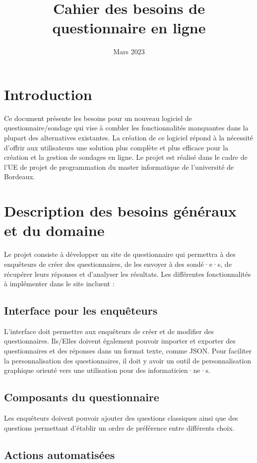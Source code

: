 \documentclass{article}
\title{Cahier des besoins de questionnaire en ligne}
\author{}
\date{Mars 2023}
\begin{document}
\maketitle

\section{Introduction}
Ce document présente les besoins pour un nouveau logiciel de questionnaire/sondage qui vise à combler les fonctionnalités manquantes dans la plupart des alternatives existantes. La création de ce logiciel répond à la nécessité d'offrir aux utilisateurs une solution plus complète et plus efficace pour la création et la gestion de sondages en ligne. Le projet est réalisé dans le cadre de l’UE de projet de programmation du master informatique de l’université de Bordeaux.

\section{Description des besoins généraux et du domaine}

Le projet consiste à développer un site de questionnaire qui permettra à des enquêteurs de créer des questionnaires, de les envoyer à des sondé·e·s, de récupérer leurs réponses et d'analyser les résultats. Les différentes fonctionnalités à implémenter dans le site incluent :

\subsection{Interface pour les enquêteurs}

L'interface doit permettre aux enquêteurs de créer et de modifier des questionnaires. Ils/Elles doivent également pouvoir importer et exporter des questionnaires et des réponses dans un format texte, comme JSON. Pour faciliter la personnalisation des questionnaires, il doit y avoir un outil de personnalisation graphique orienté vers une utilisation pour des informaticien·ne·s.

\subsection{Composants du questionnaire}

Les enquêteurs doivent pouvoir ajouter des questions classiques ainsi que des questions permettant d'établir un ordre de préférence entre différents choix.

\subsection{Actions automatisées}
\end{document}
